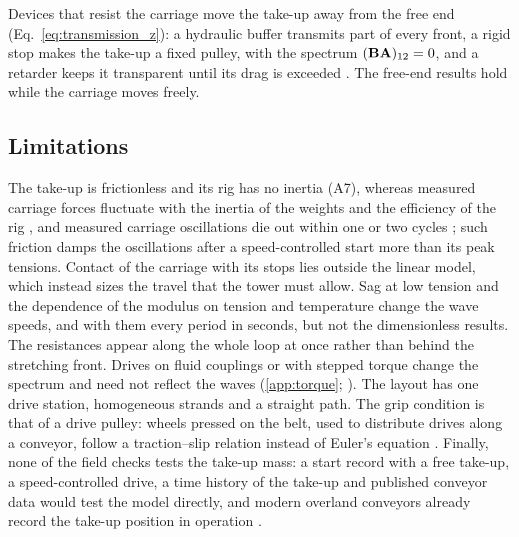 Devices that resist the carriage move the take-up away from the free end
(Eq.~\eqref{eq:transmission_z}): a hydraulic buffer transmits part of every front, a rigid stop
makes the take-up a fixed pulley, with the spectrum $(\mathbf{B}\mathbf{A})_{12}=0$, and a retarder keeps
it transparent until its drag is exceeded \citep{morrison1987,nordell1987}. The free-end results
hold while the carriage moves freely.

\subsection{Limitations}\label{sec:limitations}

The take-up is frictionless and its rig has no inertia (A7), whereas measured carriage forces
fluctuate with the inertia of the weights and the efficiency of the rig
\citep{kulinowski2021,poe2000sheave}, and measured carriage oscillations die out within one or
two cycles \citep[Fig.~9]{kulinowski2013}; such friction damps the oscillations after a
speed-controlled start more than its peak tensions. Contact of the carriage with its
stops \citep{kung2005henderson,zamorano1991} lies outside the linear model, which instead sizes
the travel that the tower must allow. Sag at low tension \citep{ellis1987} and the dependence of
the modulus on tension and temperature \citep{zarzycki2023,hou2008} change the wave speeds, and
with them every period in seconds, but not the dimensionless results. The resistances appear
along the whole loop at once rather than behind the stretching front. Drives on fluid couplings
or with stepped torque change the spectrum and need not reflect the waves (\cref{app:torque};
\citet{morrison1987}). The layout has one drive station, homogeneous strands and a straight
path. The grip condition is that of a drive pulley: wheels pressed on the belt, used to
distribute drives along a conveyor, follow a traction--slip relation instead of Euler's equation
\citep{nuttall2006}. Finally, none of the field checks tests the take-up mass: a start record with a free
take-up, a speed-controlled drive, a time history of the take-up and published conveyor data
would test the model directly, and modern overland conveyors already record the take-up
position in operation \citep{kruse2019overland}.

